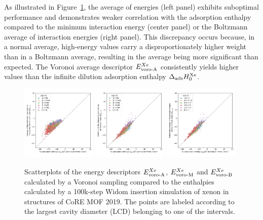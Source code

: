 \documentclass[main]{subfiles}
\begin{document}
As illustrated in Figure~\ref{fgr:compa_voro_0}, the average of energies (left panel) exhibits suboptimal performance and demonstrates weaker correlation with the adsorption enthalpy compared to the minimum interaction energy (center panel) or the Boltzmann average of interaction energies (right panel). This discrepancy occurs because, in a normal average, high-energy values carry a disproportionately higher weight than in a Boltzmann average, resulting in the average being more significant than expected. The Voronoi average descriptor $E_{\text{voro-A}}^{Xe}$ consistently yields higher values than the infinite dilution adsorption enthalpy $\Delta_{\text{ads}} H_{0}^{\text{Xe}}$. 

\begin{figure}[ht]
  \centering
    \includegraphics[width=0.32\textwidth]{figures/3-fastsim/H_Xe_0_vs_E_voro_A_overview.jpg}
    \hfill
    \includegraphics[width=0.32\textwidth]{figures/3-fastsim/H_Xe_0_vs_E_voro_M_overview.jpg}
    \hfill
    \includegraphics[width=0.32\textwidth]{figures/3-fastsim/H_Xe_0_vs_E_voro_B_overview.jpg}
    \caption{Scatterplots of the energy descriptors $E_{\text{voro-A}}^{Xe}$, $E_{\text{voro-M}}^{Xe}$ and $E_{\text{voro-B}}^{Xe}$ calculated by a Voronoi sampling compared to the enthalpies calculated by a 100k-step Widom insertion simulation of xenon in structures of CoRE MOF 2019. The points are labeled according to the largest cavity diameter (LCD) belonging to one of the intervals.}\label{fgr:compa_voro_0}
\end{figure}
\end{document}
